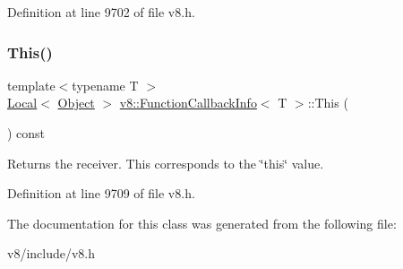 Definition at line 9702 of file v8.\+h.

\mbox{\label{classv8_1_1FunctionCallbackInfo_a4ddfd6d21732dff1c4c55d5441a8a5ca}} 
\subsubsection{\texorpdfstring{This()}{This()}}
{\footnotesize\ttfamily template$<$typename T $>$ \\
\mbox{\hyperlink{classv8_1_1Local}{Local}}$<$ \mbox{\hyperlink{classv8_1_1Object}{Object}} $>$ \mbox{\hyperlink{classv8_1_1FunctionCallbackInfo}{v8\+::\+Function\+Callback\+Info}}$<$ T $>$\+::This (\begin{DoxyParamCaption}{ }\end{DoxyParamCaption}) const}

Returns the receiver. This corresponds to the \char`\"{}this\char`\"{} value. 

Definition at line 9709 of file v8.\+h.



The documentation for this class was generated from the following file\+:\begin{DoxyCompactItemize}
\item 
v8/include/v8.\+h\end{DoxyCompactItemize}
